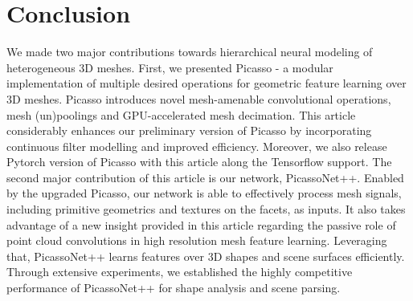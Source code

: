 \vspace{-3mm}
\section{Conclusion}
We made two major contributions towards hierarchical neural modeling of heterogeneous 3D meshes. First, we
presented Picasso - a modular implementation of multiple desired operations for geometric feature learning over 3D meshes. Picasso introduces novel mesh-amenable convolutional operations, mesh (un)poolings and GPU-accelerated mesh decimation. {\color{black}This article considerably enhances our preliminary version of Picasso by incorporating continuous filter modelling and improved efficiency. Moreover, we also release Pytorch version of Picasso with this article along the Tensorflow support. The second major contribution of this article is our network, PicassoNet++. Enabled by the upgraded Picasso, our network is able to effectively process mesh signals, including primitive geometrics and textures on the facets, as inputs.} It also takes advantage of a new insight provided in this article regarding the passive role of point cloud convolutions in high resolution mesh feature learning. Leveraging that, PicassoNet++ learns features over 3D shapes and scene surfaces efficiently. Through extensive experiments, we established the highly competitive performance of PicassoNet++ for shape analysis and scene parsing.   

 

